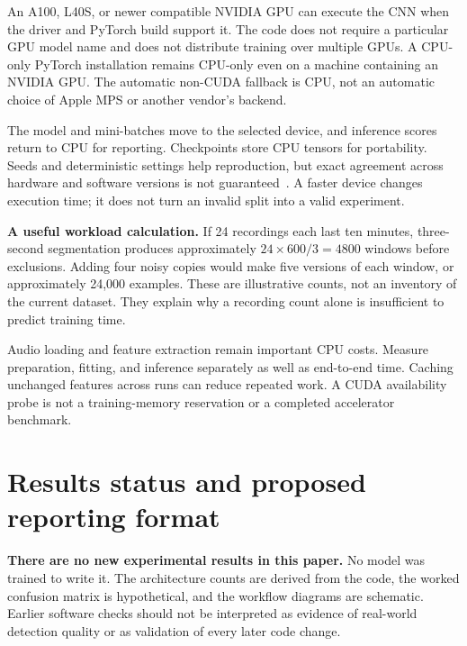 \documentclass[11pt,letterpaper]{article}
\begin{document}
An A100, L40S, or newer compatible NVIDIA GPU can execute the CNN when the
driver and PyTorch build support it. The code does not require a particular
GPU model name and does not distribute training over multiple GPUs. A
CPU-only PyTorch installation remains CPU-only even on a machine containing
an NVIDIA GPU. The automatic non-CUDA fallback is CPU, not an automatic
choice of Apple MPS or another vendor's backend.

The model and mini-batches move to the selected device, and inference scores
return to CPU for reporting. Checkpoints store CPU tensors for portability.
Seeds and deterministic settings help reproduction, but exact agreement across
hardware and software versions is not guaranteed~\cite{repro}. A faster device
changes execution time; it does not turn an invalid split into a valid experiment.

\textbf{A useful workload calculation.} If 24 recordings each last ten minutes,
three-second segmentation produces approximately
$24\times600/3=4800$ windows before exclusions. Adding four noisy copies
would make five versions of each window, or approximately 24,000 examples.
These are illustrative counts, not an inventory of the current dataset.
They explain why a recording count alone is insufficient to predict training time.

Audio loading and feature extraction remain important CPU costs. Measure
preparation, fitting, and inference separately as well as end-to-end time.
Caching unchanged features across runs can reduce repeated work. A CUDA
availability probe is not a training-memory reservation or a completed
accelerator benchmark.

\section{Results status and proposed reporting format}
\label{sec:status}
\textbf{There are no new experimental results in this paper.} No model was
trained to write it. The architecture counts are derived from the code, the
worked confusion matrix is hypothetical, and the workflow diagrams are
schematic. Earlier software checks should not be interpreted as evidence of
real-world detection quality or as validation of every later code change.
\end{document}
